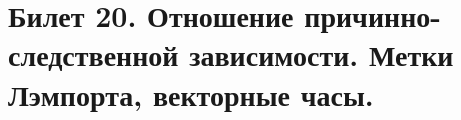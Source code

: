 \newpage
\section {Билет 20. Отношение причинно-следственной зависимости. Метки Лэмпорта, векторные часы.}